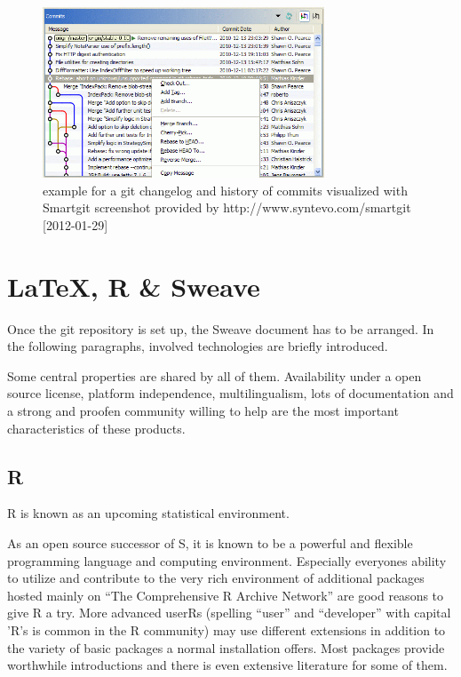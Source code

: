 \documentclass{ifacconf}
\begin{document}
\begin{figure}[h]
\begin{center}
\includegraphics[width=8.4cm]{pics/Smartgit_graphical_Log.png}    %
\caption{example for a git changelog and history of commits visualized with Smartgit \newline 
screenshot provided by http://www.syntevo.com/smartgit [2012-01-29]} 
\label{fig:gitHistory}
\end{center}
\end{figure}

\section{\LaTeX, R \& Sweave}\label{sec:structure}

Once the git repository is set up, the Sweave document has to be arranged. 
In the following paragraphs, involved technologies are briefly introduced.

Some central properties are shared by all of them. Availability under a open source license, 
platform independence, multilingualism, lots of documentation and a strong and proofen 
community willing to help are the most important characteristics of these products.


\subsection{R}
R \citep{R} is known as an upcoming statistical environment. 

As an open source successor of S, it is known to be a powerful and flexible programming language
and computing environment. Especially everyones ability to utilize and
contribute to the very rich environment of additional packages hosted 
mainly on “The Comprehensive R Archive Network” are good reasons to give R a try. 
More advanced userRs (spelling “user” and “developer” with capital
’R’s is common in the R community) may use different extensions in 
addition to the variety of basic packages a normal installation offers.
Most packages provide worthwhile introductions and there is even extensive literature
for some of them.
\end{document}
